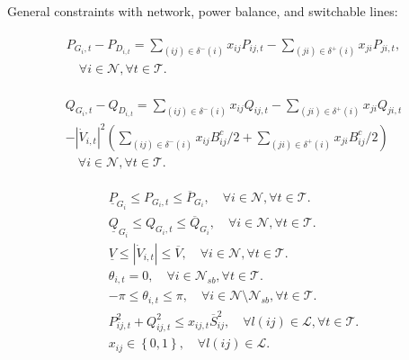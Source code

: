 \documentclass{article}
\begin{document}
General constraints with network, power balance, and switchable lines:
{\allowdisplaybreaks
\begin{align}
  \begin{split}
    P_{G_{i},t} - P_{D_{i,t}} = \sum_{(ij) \in \delta^{-}(i)}x_{ij}P_{ij,t} - \sum_{(ji) \in \delta^{+}(i)}x_{ji}P_{ji,t},
    \\ \quad \forall i \in \mathcal{N}, \forall t \in \mathcal{T}.
  \end{split}
\end{align}

\begin{align}
  \begin{split}
    Q_{G_{i},t} - Q_{D_{i,t}} = \sum_{(ij) \in \delta^{-}(i)}x_{ij}Q_{ij,t} - \sum_{(ji) \in \delta^{+}(i)}x_{ji}Q_{ji,t}  
    \\- \left|\dot{V}_{i,t} \right|^2(\sum_{(ij) \in \delta^{-}(i)}x_{ij}B^{c}_{ij}/2 +  \sum_{(ji) \in \delta^{+}(i)}x_{ji}B^{c}_{ij}/2)  
    \\ \quad \forall i \in \mathcal{N}, \forall t \in \mathcal{T}.
  \end{split}
\end{align}

\begin{align}
  \underline{P}_{G_{i}} \leq P_{G_{i},t} \leq \overline{P}_{G_{i}},  \quad \forall i \in \mathcal{N}, \forall t \in \mathcal{T}.\\
  \underline{Q}_{G_{i}} \leq Q_{G_{i},t} \leq \overline{Q}_{G_{i}},  \quad \forall i \in \mathcal{N}, \forall t \in \mathcal{T}.\\
  \underline{V} \leq \left|\dot{V}_{i,t} \right| \leq \overline{V},  \quad \forall i \in \mathcal{N}, \forall t \in \mathcal{T}.\\
  \theta_{i,t} = 0, \quad \forall i \in \mathcal{N}_{sb}, \forall t \in \mathcal{T}.\\
  -\pi \leq \theta_{i,t} \leq \pi, \quad \forall i \in \mathcal{N} \setminus \mathcal{N}_{sb}, \forall t \in \mathcal{T}.\\
  P_{ij,t}^{2}+ Q_{ij,t}^{2} \leq x_{ij,t}\overline{S}_{ij}^{2}, \quad   \forall l(ij) \in \mathcal{L}, \forall t \in \mathcal{T}.\\
  x_{ij} \in \left\{0,1 \right\}, \quad   \forall l(ij) \in \mathcal{L}.
\end{align}
}
\end{document}
